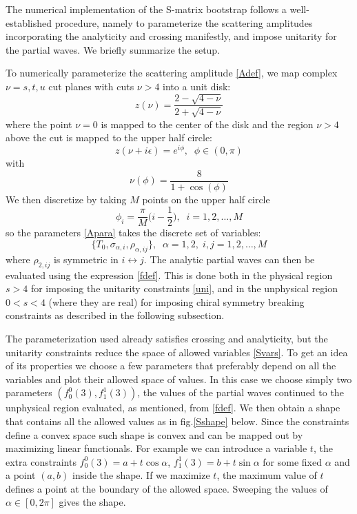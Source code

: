 \documentclass[12pt,letterpaper]{article}
\begin{document}
The numerical implementation of the S-matrix bootstrap follows a well-established procedure, namely to parameterize the scattering amplitudes incorporating the analyticity and crossing manifestly, and impose unitarity for the partial waves.  We briefly summarize the setup.

To numerically parameterize the scattering amplitude \eqref{Adef}, we map complex $\nu=s,t,u$ cut planes with cuts $\nu>4$ into a unit disk:
\begin{equation}\label{zmap}
	z(\nu)=\frac{2-\sqrt{4-\nu}}{2+\sqrt{4-\nu}}
\end{equation}
where the point $\nu=0$ is mapped to the center of the disk and the region $\nu>4$ above the cut is mapped to the upper half circle:
\begin{equation}\label{h33}
	z(\nu+i\epsilon)=e^{i\phi},\;\; \phi\in(0,\pi)
\end{equation}
with
\begin{equation}\label{h34}
	\nu(\phi)=\frac{8}{1+\cos(\phi)}
\end{equation}
We then discretize by taking $M$ points on the upper half circle
\begin{equation}\label{phii}
	\phi_i=\frac{\pi}{M}\bigg(i-\frac{1}{2}\bigg),\;\; i=1,2,\ldots,M
\end{equation}
so the parameters \eqref{Apara} takes the discrete set of variables:
\begin{equation}\label{Svars}
	\{T_0,\sigma_{\alpha,i},\rho_{\alpha,ij}\},\;\;\alpha=1,2,\; i,j=1,2,\ldots,M
\end{equation}
where $\rho_{2,ij}$ is symmetric in $i\leftrightarrow j$. The analytic partial waves can then be evaluated using the expression \eqref{fdef}. This is done both in the physical region $s>4$ for imposing the unitarity constraints \eqref{uni}, and in the unphysical region $0<s<4$ (where they are real) for imposing chiral symmetry breaking constraints as described in the following subsection. 

The parameterization used already satisfies crossing and analyticity, but the unitarity constraints reduce the space of allowed variables \eqref{Svars}. To get an idea of its properties we choose a few parameters that preferably depend on all the variables and plot their allowed space of values. In this case we choose simply two parameters $(f^0_0(3),f^1_1(3))$, the values of the partial waves continued to the unphysical region evaluated, as mentioned, from \eqref{fdef}. We then obtain a shape that contains all the allowed values as in fig.\ref{Sshape} below. Since the constraints define a convex space such shape is convex and can be mapped out by maximizing linear functionals. For example we can introduce a variable $t$, the extra constraints $f^0_0(3)=a+t \cos\alpha$, $f^1_1(3)=b+t \sin\alpha$ for some fixed $\alpha$ and a point $(a,b)$ inside the shape. If we maximize $t$, the maximum value of $t$ defines a point at the boundary of the allowed space. Sweeping the values of $\alpha\in[0,2\pi]$ gives the shape.
\end{document}
